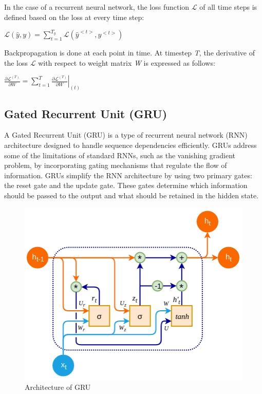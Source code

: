 \documentclass{ieeeojies}
\begin{document}
In the case of a recurrent neural network, the loss function $\mathcal{L}$ of all time steps is defined based on the loss at every time step:
\newline \centerline{$\mathcal{L}(\hat{y},y) = \displaystyle \sum_{t=1}^{T_{y}}\mathcal{L}(\hat{y}^{<t>},y^{<t>})$}
Backpropagation is done at each point in time. At timestep \textit{T}, the derivative of the loss $\mathcal{L}$ with respect to weight matrix \textit{W} is expressed as follows:
\newline \centerline{$\displaystyle \frac{\partial \mathcal{L}^{(T)}}{\partial W} = \displaystyle \sum_{t=1}^{T} \left. \frac{\partial \mathcal{L}^{(T)}}{\partial W} \right|_{(t)}$}
\subsection{Gated Recurrent Unit (GRU)}
A Gated Recurrent Unit (GRU) is a type of recurrent neural network (RNN) architecture designed to handle sequence dependencies efficiently. GRUs address some of the limitations of standard RNNs, such as the vanishing gradient problem, by incorporating gating mechanisms that regulate the flow of information. GRUs simplify the RNN architecture by using two primary gates: the reset gate and the update gate. These gates determine which information should be passed to the output and what should be retained in the hidden state.
\begin{figure}[H]
	\centering
	\begin{minipage}{0.25\textwidth}
		\centering
		\includegraphics[width=1\textwidth]{bibliography/Images/GRU_Img1.png}
		\caption{Architecture of GRU}
		\label{fig:1}
	\end{minipage}
\end{figure}
\end{document}
